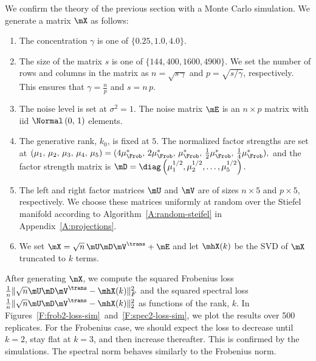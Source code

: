 We confirm the theory of the previous section with a Monte Carlo simulation.  We generate a matrix $\mX$ as follows:
\begin{enumerate}
    \item The concentration $\gamma$ is one of $\{ 0.25, 1.0, 4.0 \}$.
    \item The size of the matrix $s$ is one of $\{ 144, 400, 1600, 4900 \}$.
        We set the number of rows and columns in the matrix as
        $n = \sqrt{ s \, \gamma }$ and $p = \sqrt{s / \gamma}$, respectively.
        This ensures that $\gamma = \frac{n}{p}$ and $s = n \, p$.
    \item The noise level is set at $\sigma^2 = 1$.  The noise matrix $\mE$
        is an $n \times p$ matrix with iid $\Normal\left( 0, \, 1\right)$
        elements.
    \item The generative rank, $k_0$, is fixed at $5$.  The normalized
        factor strengths are set at
        \(
            (
                \mu_1, \,
                \mu_2, \,
                \mu_3, \,
                \mu_4, \,
                \mu_5
            )
            =
            (
                4 \mu_\Frob^\ast, \,
                2 \mu_\Frob^\ast, \,
                  \mu_\Frob^\ast, \,
                \frac{1}{2} \mu_\Frob^\ast, \,
                \frac{1}{4} \mu_\Frob^\ast
            ),
        \)
        and the factor strength matrix is
        \(
            \mD 
            = 
            \diag\left( 
                \mu_1^{1/2},
                \mu_2^{1/2},
                \ldots, 
                \mu_5^{1/2}
            \right).
        \)
    \item The left and right factor matrices $\mU$ and $\mV$ are of sizes
        $n \times 5$ and $p \times 5$, respectively.  We choose these matrices
        uniformly at random over the Stiefel manifold according
        to Algorithm~\ref{A:random-steifel} in Appendix~\ref{A:projections}.
    \item We set $\mX = \sqrt{n} \, \mU \mD \mV^\trans + \mE$ and let
        $\mhX(k)$ be the SVD of $\mX$ truncated to $k$ terms.
\end{enumerate}
After generating $\mX$, we compute the squared Frobenius loss
\(
    \frac{1}{n} \| \sqrt{n}\mU \mD \mV^\trans - \mhX(k) \|_F^2
\)
and the squared spectral loss
\(
    \frac{1}{n} \| \sqrt{n}\mU \mD \mV^\trans - \mhX(k) \|_2^2
\)
as functions of the rank, $k$.  In 
Figures~\ref{F:frob2-loss-sim}~and~\ref{F:spec2-loss-sim}, we plot the results 
over 500 replicates.  For the Frobenius case, we should expect the loss to
decrease until $k=2$, stay flat at $k=3$, and then increase thereafter.  This 
is confirmed by the simulations.  The spectral norm behaves similarly to the 
Frobenius norm.


